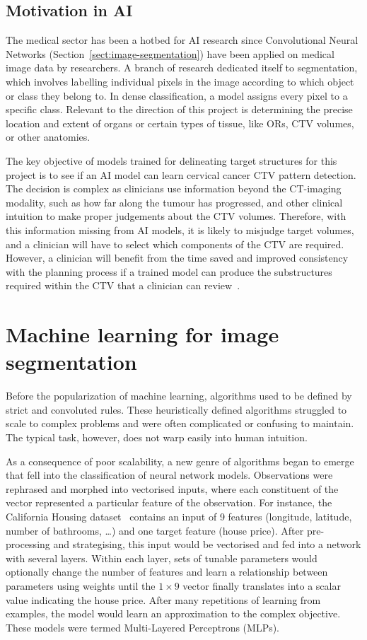 \documentclass[12pt,twoside]{report}
\begin{document}
\subsection{Motivation in AI}

The medical sector has been a hotbed for AI research since  Convolutional Neural Networks (Section~\ref{sect:image-segmentation}) have been applied on medical image data by researchers. A branch of research dedicated itself to segmentation, which involves labelling individual pixels in the image according to which object or class they belong to. In dense classification, a model assigns every pixel to a specific class. Relevant to the direction of this project is determining the precise location and extent of organs or certain types of tissue, like ORs, CTV volumes, or other anatomies. 

The key objective of models trained for delineating target structures for this project is to see if an AI model can learn cervical cancer CTV pattern detection. The decision is complex as clinicians use information beyond the CT-imaging modality, such as how far along the tumour has progressed, and other clinical intuition to make proper judgements about the CTV volumes. Therefore, with this information missing from AI models, it is likely to misjudge target volumes, and a clinician will have to select which components of the CTV are required. However, a clinician will benefit from the time saved and improved consistency with the planning process if a trained model can produce the substructures required within the CTV that a clinician can review~\cite{AMLART-data}.

\section{Machine learning for image segmentation}\label{sect:machine-learning-for-image-segmentation}

Before the popularization of machine learning, algorithms used to be defined by strict and convoluted rules. These heuristically defined algorithms struggled to scale to complex problems and were often complicated or confusing to maintain. The typical task, however, does not warp easily into human intuition.

As a consequence of poor scalability, a new genre of algorithms began to emerge that fell into the classification of neural network models. Observations were rephrased and morphed into vectorised inputs, where each constituent of the vector represented a particular feature of the observation. For instance, the California Housing dataset~\cite{kelleypace1997} contains an input of 9 features (longitude, latitude, number of bathrooms, \dots) and one target feature (house price). After pre-processing and strategising, this input would be vectorised and fed into a network with several layers. Within each layer, sets of tunable parameters would optionally change the number of features and learn a relationship between parameters using weights until the $1 \times 9$ vector finally translates into a scalar value indicating the house price. After many repetitions of learning from examples, the model would learn an approximation to the complex objective. These models were termed Multi-Layered Perceptrons (MLPs).
\end{document}
